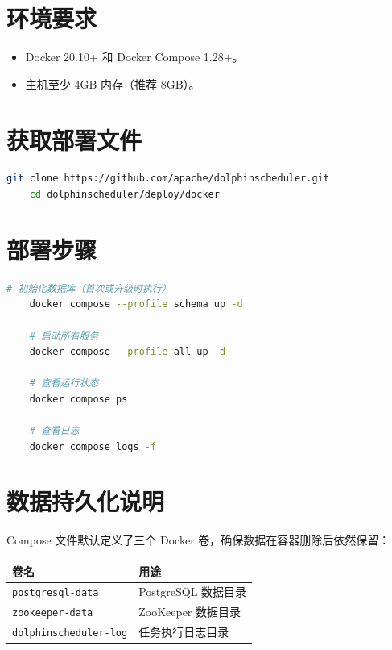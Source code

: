 \documentclass[UTF8, a4paper]{ctexbook}
\begin{document}
\section{环境要求}
	
\begin{itemize}
	\item Docker 20.10+ 和 Docker Compose 1.28+。
	\item 主机至少 4GB 内存（推荐 8GB）。
\end{itemize}
	
\section{获取部署文件}
	
\begin{lstlisting}[language=bash]
	git clone https://github.com/apache/dolphinscheduler.git
	cd dolphinscheduler/deploy/docker
\end{lstlisting}
	
\section{部署步骤}
	
\begin{lstlisting}[language=bash]
	# 初始化数据库（首次或升级时执行）
	docker compose --profile schema up -d
	
	# 启动所有服务
	docker compose --profile all up -d
	
	# 查看运行状态
	docker compose ps
	
	# 查看日志
	docker compose logs -f
\end{lstlisting}
	
\section{数据持久化说明}
	
Compose 文件默认定义了三个 Docker 卷，确保数据在容器删除后依然保留：
	
\begin{longtable}{p{5cm}p{8cm}}
	\toprule
	\textbf{卷名} & \textbf{用途} \\
	\midrule
	\texttt{postgresql-data}    & PostgreSQL 数据目录 \\
	\texttt{zookeeper-data}     & ZooKeeper 数据目录 \\
	\texttt{dolphinscheduler-log} & 任务执行日志目录 \\
	\bottomrule
\end{longtable}
	
\end{document}
